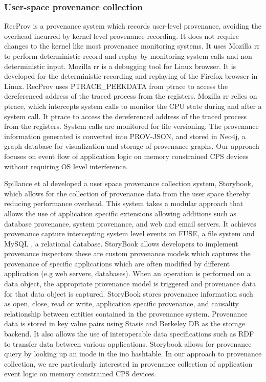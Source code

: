 \subsubsection{User-space provenance collection}
RecProv \cite{rec_prov} is a provenance system which records user-level provenance, avoiding the overhead incurred by kernel level provenance recording. It does not require changes to the kernel like most provenance monitoring systems. It uses Mozilla rr to perform deterministic record and replay by monitoring system calls  and non deterministic input. Mozilla rr is a debugging tool for Linux browser. It is developed for the deterministic recording and replaying of the Firefox browser in Linux. RecProv uses PTRACE\_PEEKDATA from ptrace to access the dereferenced address of the traced process from the registers. Mozilla rr relies on ptrace, which intercepts system calls to monitor the CPU state during and after a system call. It ptrace to access the dereferenced address of the traced process from the registers. System calls are monitored for file versioning. The provenance information generated is converted into PROV-JSON, and stored in Neo4j, a graph database for visualization and storage of provenance graphs. Our approach
focuses on event flow of application logic on memory constrained CPS devices without requiring OS level interference.


Spillance et al \cite{story} developed a user space provenance collection system, Storybook, which allows for the collection of provenance data from the user space thereby reducing performance overhead. This system takes a modular approach that allows the use of application specific extensions allowing additions such as database provenance, system provenance, and web and email servers. It achieves provenance capture intercepting system level events on FUSE, a file system and MySQL , a relational database. StoryBook allows developers to implement provenance inspectors these are custom provenance models which captures the provenance of specific applications which are often modified by different application (e.g web servers, databases). When an operation is performed on a data object, the appropriate provenance model is triggered and provenance data for that data object is captured. StoryBook stores provenance information such as open, close, read or write, application specific provenance, and causality relationship between entities contained in the provenance system. Provenance data is stored in key value pairs using Stasis and Berkeley DB as the storage backend. It also allows the use of interoperable data specifications such as RDF to transfer data between various applications. Storybook allows for provenance query by looking up an inode in the ino hashtable. In our approach to provenance collection, we are particularly interested in provenance collection of application event logic on memory constrained CPS devices.


